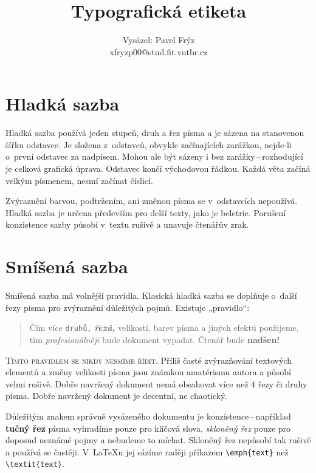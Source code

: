 \documentclass[10pt,a4paper,twocolumn]{article}
\title{Typografická etiketa}
\author{Vysázel: Pavel Frýz\\
      xfryzp00@stud.fit.vutbr.cz}
\date{}
\begin{document}
\maketitle

\section{Hladká sazba}

Hladká sazba používá jeden stupeň, druh a řez písma a je sázena
na stanovenou šířku odstavce. Je složena z~od\-stav\-ců, obvykle
začínajících zarážkou, nejde-li o~první odstavec za nadpisem.
Mohou ale být sázeny i bez zarážky\,--\,roz\-ho\-du\-jí\-cí je celková
grafická úprava. Odstavec končí vý\-cho\-do\-vou řádkou. Každá věta
začíná velkým písmenem, nesmí začínat číslicí.

Zvýraznění barvou, podtržením, ani změnou písma se v~odstavcích
nepoužívá. Hladká sazba je určena především pro delší texty,
jako je beletrie. Porušení konzistence sazby působí v~textu
rušivě a unavuje čtenářův zrak.

\section{Smíšená sazba} \label{smisenasazba}

Smíšená sazba má volnější pravidla. Klasická hladká sazba se
doplňuje o~další řezy písma pro zvýraznění důležitých
pojmů. Existuje „pravidlo“:

\begin{quotation}
Čím více \texttt{druhů,} \textbf{\emph{řezů,}} {\small velikostí,} barev
písma \textsf{a jiných efektů} použi{\large jeme,} tím
\emph{profesionálněji} {\Large bude} dokument vypadat. Čtenář
{\tiny bude} \textbf{nadšen!}
\end{quotation}


\textsc{Tímto pravidlem se nikdy nesmíme řídit.} Příliš časté
zvýrazňování textových elementů a změny ve\-li\-kos\-ti písma jsou
známkou amatérismu autora a působí velmi rušivě. Dobře
navržený dokument nemá obsahovat více než 4 řezy či druhy
písma. Dobře navržený dokument je decentní, ne chaotický.

Důležitým znakem správně vysázeného dokumentu je
konzistence\,--\,například \textbf{tučný řez} písma vyhradíme pou\-ze
pro klíčová slova, \emph{skloněný řez} pou\-ze pro doposud ne\-zná\-mé pojmy a
nebudeme to míchat. Skloněný řez ne\-pů\-so\-bí tak rušivě a používá se
častěji. V~\LaTeX u jej sázíme raději příkazem \verb|\emph{text}| než
\verb|\textit{text}|.
\end{document}
